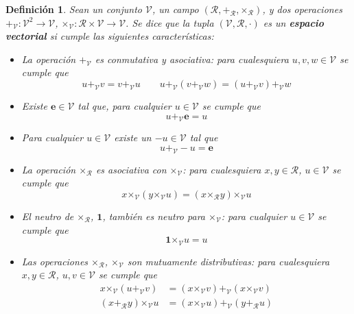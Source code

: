 \documentclass[12pt,letterpaper]{book}
\newtheorem{definicion}{Definición}[chapter]
\begin{document}
\begin{definicion}
Sean un conjunto $\mathcal{V}$, un campo $(\mathcal{R},\boldsymbol{+}_\mathcal{R},\boldsymbol{\times}_\mathcal{R})$, y dos operaciones $\boldsymbol{+}_\mathcal{V} : \mathcal{V}^{2} \rightarrow \mathcal{V}$, $\boldsymbol{\times}_\mathcal{V} : \mathcal{R}\times\mathcal{V} \rightarrow \mathcal{V}$. Se dice que la tupla $(\mathcal{V},\mathcal{R},\mathcal{\cdot})$ es un \textbf{espacio vectorial} si cumple las siguientes características:
\begin{itemize}
\item La operación $\boldsymbol{+}_\mathcal{V}$ es conmutativa y asociativa: para cualesquiera $u, v, w \in \mathcal{V}$ se cumple que
\begin{equation*}
u +_\mathcal{V} v = v +_\mathcal{V} u \qquad u +_\mathcal{V} (v +_\mathcal{V} w) = (u +_\mathcal{V} v) +_\mathcal{V} w
\end{equation*}
\item Existe $\boldsymbol{e} \in \mathcal{V}$ tal que, para cualquier $u \in \mathcal{V}$ se cumple que
\begin{equation*}
 u +_\mathcal{V} \boldsymbol{e} = u
\end{equation*}
\item Para cualquier $u \in \mathcal{V}$ existe un $-u \in \mathcal{V}$ tal que
\begin{equation*}
 u +_\mathcal{V} -u =  \boldsymbol{e}
\end{equation*}
\item La operación $\boldsymbol{\times}_\mathcal{R}$ es asociativa con $\boldsymbol{\times}_\mathcal{V}$: para cualesquiera $x, y \in \mathcal{R}$, $u \in \mathcal{V}$ se cumple que
\begin{equation*}
x \boldsymbol{\times}_\mathcal{V} (y \boldsymbol{\times}_\mathcal{V} u ) = (x \boldsymbol{\times}_\mathcal{R} y) \boldsymbol{\times}_\mathcal{V} u
\end{equation*}
\item El neutro de $\boldsymbol{\times}_\mathcal{R}$, $\boldsymbol{1}$, también es neutro para $\boldsymbol{\times}_\mathcal{V}$: para cualquier $u \in \mathcal{V}$ se cumple que
\begin{equation*}
\boldsymbol{1} \boldsymbol{\times}_\mathcal{V} u = u
\end{equation*}
\item Las operaciones $\boldsymbol{\times}_\mathcal{R}$, $\boldsymbol{\times}_\mathcal{V}$ son mutuamente distributivas: para cualesquiera $x, y \in \mathcal{R}$, $u, v \in \mathcal{V}$ se cumple que
\begin{align*}
x \boldsymbol{\times}_\mathcal{V} (u \boldsymbol{+}_\mathcal{V} v) &= (x \boldsymbol{\times}_\mathcal{V} v ) \boldsymbol{+}_\mathcal{V} (x \boldsymbol{\times}_\mathcal{V} v) \\
(x \boldsymbol{+}_\mathcal{R} y) \boldsymbol{\times}_\mathcal{V} u &= (x \boldsymbol{\times}_\mathcal{V} u ) \boldsymbol{+}_\mathcal{V} ( y \boldsymbol{+}_\mathcal{R} u)
\end{align*}
\end{itemize}
\end{definicion}
\end{document}
